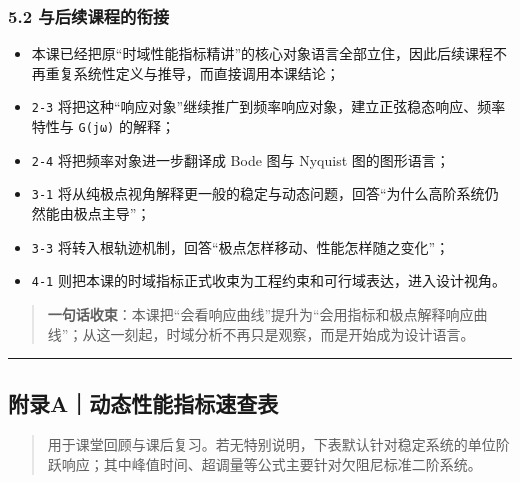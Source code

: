 \documentclass[
  11pt]{article}
\providecommand{\tightlist}{%
  \setlength{\itemsep}{0pt}\setlength{\parskip}{0pt}}
\begin{document}
\subsubsection{5.2
与后续课程的衔接}\label{ux4e0eux540eux7eedux8bfeux7a0bux7684ux8854ux63a5}

\begin{itemize}
\tightlist
\item
  本课已经把原``时域性能指标精讲''的核心对象语言全部立住，因此后续课程不再重复系统性定义与推导，而直接调用本课结论；
\item
  \texttt{2-3}
  将把这种``响应对象''继续推广到频率响应对象，建立正弦稳态响应、频率特性与
  \texttt{G(jω)} 的解释；
\item
  \texttt{2-4} 将把频率对象进一步翻译成 Bode 图与 Nyquist 图的图形语言；
\item
  \texttt{3-1}
  将从纯极点视角解释更一般的稳定与动态问题，回答``为什么高阶系统仍然能由极点主导''；
\item
  \texttt{3-3}
  将转入根轨迹机制，回答``极点怎样移动、性能怎样随之变化''；
\item
  \texttt{4-1}
  则把本课的时域指标正式收束为工程约束和可行域表达，进入设计视角。
\end{itemize}

\begin{quote}
\textbf{一句话收束}：本课把``会看响应曲线''提升为``会用指标和极点解释响应曲线''；从这一刻起，时域分析不再只是观察，而是开始成为设计语言。
\end{quote}

\begin{center}\rule{0.5\linewidth}{0.5pt}\end{center}

\subsection{附录A｜动态性能指标速查表}\label{ux9644ux5f55aux52a8ux6001ux6027ux80fdux6307ux6807ux901fux67e5ux8868}

\begin{quote}
用于课堂回顾与课后复习。若无特别说明，下表默认针对稳定系统的单位阶跃响应；其中峰值时间、超调量等公式主要针对欠阻尼标准二阶系统。
\end{quote}
\end{document}
